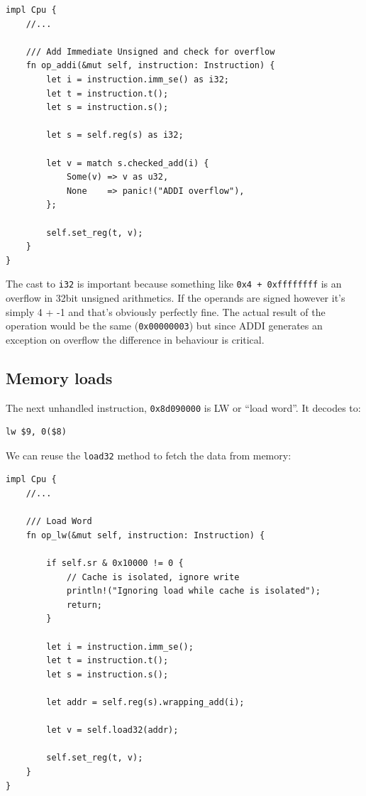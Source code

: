 \documentclass[a4paper]{article}
\newcommand{\code}[1] {\texttt{#1}}
\begin{document}
\begin{lstlisting}
impl Cpu {
    //...

    /// Add Immediate Unsigned and check for overflow
    fn op_addi(&mut self, instruction: Instruction) {
        let i = instruction.imm_se() as i32;
        let t = instruction.t();
        let s = instruction.s();

        let s = self.reg(s) as i32;

        let v = match s.checked_add(i) {
            Some(v) => v as u32,
            None    => panic!("ADDI overflow"),
        };

        self.set_reg(t, v);
    }
}
\end{lstlisting}

The cast to \code{i32} is important because something like
\code{0x4 + 0xffffffff} is an overflow in 32bit unsigned
arithmetics. If the operands are signed however it's simply 4 + -1 and
that's obviously perfectly fine. The actual result of the operation
would be the same (\code{0x00000003}) but since ADDI generates an
exception on overflow the difference in behaviour is critical.

\subsection{Memory loads}

The next unhandled instruction, \code{0x8d090000} is LW or ``load
word''. It decodes to:

\begin{lstlisting}[language=assembly]
lw $9, 0($8)
\end{lstlisting}

We can reuse the \code{load32} method to fetch the data from memory:

\begin{lstlisting}
impl Cpu {
    //...

    /// Load Word
    fn op_lw(&mut self, instruction: Instruction) {

        if self.sr & 0x10000 != 0 {
            // Cache is isolated, ignore write
            println!("Ignoring load while cache is isolated");
            return;
        }

        let i = instruction.imm_se();
        let t = instruction.t();
        let s = instruction.s();

        let addr = self.reg(s).wrapping_add(i);

        let v = self.load32(addr);

        self.set_reg(t, v);
    }
}
\end{lstlisting}
\end{document}
